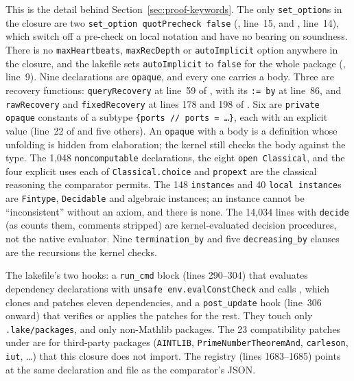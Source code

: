 This is the detail behind Section~\ref{sec:proof-keywords}. The only
\texttt{set\_option}s in the closure are two
\texttt{set\_option quotPrecheck false}
(, line~15, and
, line~14),
which switch off a pre-check on local notation and have no bearing on
soundness. There is no \texttt{maxHeartbeats}, \texttt{maxRecDepth} or
\texttt{autoImplicit} option anywhere in the closure, and the lakefile
sets \texttt{autoImplicit} to \texttt{false} for the whole package
(, line~9). Nine declarations are
\texttt{opaque}, and every one carries a body. Three are recovery functions:
\texttt{queryRecovery} at line~59 of
, with its
\texttt{:= by} at line~86, and \texttt{rawRecovery} and
\texttt{fixedRecovery} at lines 178 and 198 of
. Six are
\texttt{private opaque} constants of a subtype
\texttt{\{ports // ports = \ldots\}}, each with an explicit value
(line~22 of  and five
others). An \texttt{opaque} with a body is a definition whose unfolding
is hidden from elaboration; the kernel still checks the body against the
type. The 1,048 \texttt{noncomputable} declarations, the eight
\texttt{open Classical}, and the four explicit uses each of
\texttt{Classical.choice} and \texttt{propext} are the classical
reasoning the comparator permits. The 148 \texttt{instance}s and 40
\texttt{local instance}s are \texttt{Fintype}, \texttt{Decidable} and
algebraic instances; an instance cannot be ``inconsistent'' without an
axiom, and there is none. The 14,034 lines with \texttt{decide} (as  counts them, comments stripped) are
kernel-evaluated decision procedures, not the native evaluator. Nine
\texttt{termination\_by} and five \texttt{decreasing\_by} clauses are the
recursions the kernel checks.

The lakefile's two hooks: a \texttt{run\_cmd} block (lines 290--304) that
evaluates dependency declarations with \texttt{unsafe env.evalConstCheck}
and calls , which clones and patches
eleven dependencies, and a \texttt{post\_update} hook (line~306 onward)
that verifies or applies the patches for the rest. They touch only
\texttt{.lake/packages}, and only non-Mathlib packages. The 23
compatibility patches under  are for third-party
packages (\texttt{AINTLIB}, \texttt{PrimeNumberTheoremAnd},
\texttt{carleson}, \texttt{iut}, \ldots) that this closure does not
import. The registry  (lines
1683--1685) points at the same declaration and file as the comparator's
JSON.

